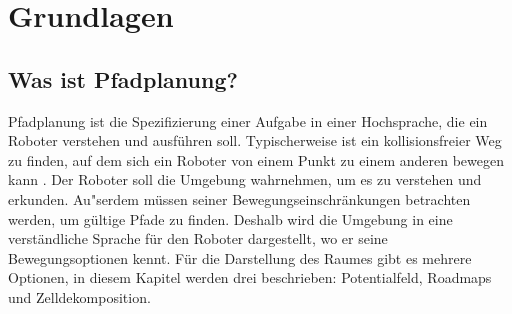 \chapter{Grundlagen}

\section{Was ist Pfadplanung?}
Pfadplanung ist die Spezifizierung einer Aufgabe in einer Hochsprache, die ein Roboter verstehen und ausführen soll. Typischerweise ist ein kollisionsfreier Weg zu finden, auf dem sich ein Roboter von einem Punkt zu einem anderen bewegen kann \cite[~S. 1]{Principles:05}. Der Roboter soll die Umgebung wahrnehmen, um es zu verstehen und erkunden. Au"serdem müssen seiner Bewegungseinschränkungen betrachten werden, um gültige Pfade zu finden. Deshalb wird die Umgebung in eine verständliche Sprache für den Roboter dargestellt, wo er seine Bewegungsoptionen kennt. Für die Darstellung des Raumes gibt es mehrere Optionen, in diesem Kapitel werden drei beschrieben: Potentialfeld, Roadmaps und Zelldekomposition.


